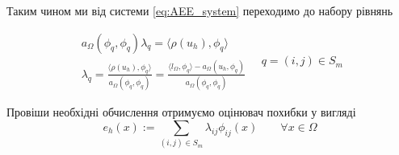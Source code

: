 Таким чином ми від системи \eqref{eq:AEE_system} переходимо до набору рівнянь

\begin{equation}
	\begin{split}
		a_\Omega(\phi_q, \phi_q) \lambda_q = \langle \rho(u_h), \phi_q \rangle\\
		\lambda_q = \frac{\langle \rho(u_h), \phi_q \rangle}{a_\Omega(\phi_q, \phi_q)}
			= \frac{\langle l_\Omega, \phi_q\rangle - a_\Omega(u_h, \phi_q)}{a_\Omega(\phi_q, \phi_q)}
	\end{split}
	\quad q = (i,j) \in S_m
\end{equation}

Провіши необхідні обчислення отримуємо оцінювач похибки у вигляді
\begin{equation}\label{eq:AEE_final}
	e_h(x) := \sum \limits_{(i,j) \in S_m} \lambda_{ij} \phi_{ij}(x) \qquad \forall x \in \Omega
\end{equation}

